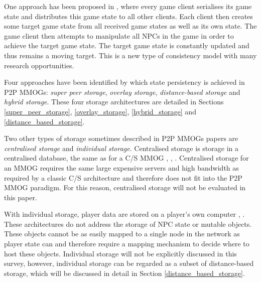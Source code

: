\documentclass[10pt,a4paper,journal,cspaper,compsoc]{IEEEtran}
\begin{document}
One approach has been proposed in \cite{Chandler_disconnected_games}, where every game client serialises its game state and distributes this game
state to all other clients. Each client then creates some target game state from all received game states as well as its own state. The game client
then attempts to manipulate all NPCs in the game in order to achieve the target game state. The target game state is constantly updated and thus
remains a moving target. This is a new type of consistency model with many research opportunities.

Four approaches have been identified by which state persistency is achieved in P2P MMOGs: \emph{super peer storage}, \emph{overlay storage},
\emph{distance-based storage} and \emph{hybrid storage}. These four storage architectures are detailed in Sections \ref{super_peer_storage},
\ref{overlay_storage}, \ref{hybrid_storage} and \ref{distance_based_storage}.

Two other types of storage sometimes described in P2P MMOGs papers are \emph{centralised storage} and \emph{individual storage}. Centralised storage
is storage in a centralised database, the same as for a C/S MMOG \cite{badumna_engine}, \cite{rooney_centralised_storage},
\cite{hybrid_p2p_cs_centralised}. Centralised storage for an MMOG requires the same large expensive servers and high bandwidth as required by a
classic C/S architecture and therefore does not fit into the P2P MMOG paradigm. For this reason, centralised storage will not be evaluated in this
paper.

With individual storage, player data are stored on a player's own computer \cite{individual_storage1}, \cite{cheat_proof_playout}. These
architectures do not address the storage of NPC state or mutable objects. These objects cannot be as easily mapped to a single node in the network as
player state can and therefore require a mapping mechanism to decide where to host these objects. Individual storage will not be explicitly discussed
in this survey, however, individual storage can be regarded as a subset of distance-based storage, which will be discussed in detail in Section
\ref{distance_based_storage}.
\end{document}
